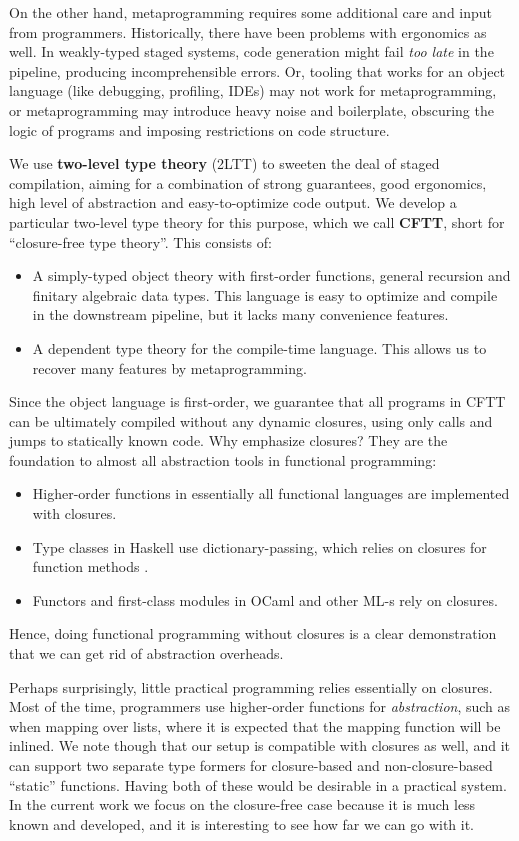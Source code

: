 \documentclass[acmsmall,screen]{acmart}
\theoremstyle{remark}
\begin{document}
On the other hand, metaprogramming requires some additional care and input from
programmers. Historically, there have been problems with ergonomics as well. In
weakly-typed staged systems, code generation might fail \emph{too late} in the
pipeline, producing incomprehensible errors. Or, tooling that works for an
object language (like debugging, profiling, IDEs) may not work for metaprogramming, or
metaprogramming may introduce heavy noise and boilerplate, obscuring the logic
of programs and imposing restrictions on code structure.

We use \textbf{two-level type theory} (2LTT) \cite{twolevel,staged2ltt} to
sweeten the deal of staged compilation, aiming for a combination of strong
guarantees, good ergonomics, high level of abstraction and easy-to-optimize code
output. We develop a particular two-level type theory for this purpose, which we
call \textbf{CFTT}, short for ``closure-free type theory''. This consists of:
\begin{itemize}
\item A simply-typed object theory with first-order functions, general recursion and
      finitary algebraic data types. This language is easy to optimize and compile
      in the downstream pipeline, but it lacks many convenience features.
\item A dependent type theory for the compile-time language. This
      allows us to recover many features by metaprogramming.
\end{itemize}
Since the object language is first-order, we guarantee that all programs in CFTT
can be ultimately compiled without any dynamic closures, using only calls and
jumps to statically known code. Why emphasize closures?  They are the
foundation to almost all abstraction tools in functional programming:
\begin{itemize}
\item Higher-order functions in essentially all functional languages are implemented with closures.
\item Type classes in Haskell use dictionary-passing, which relies on closures for function methods \cite{DBLP:conf/popl/WadlerB89}.
\item Functors and first-class modules in OCaml \cite{leroy2023ocaml} and other ML-s rely on closures.
\end{itemize}
Hence, doing functional programming without closures is a clear demonstration
that we can get rid of abstraction overheads.

Perhaps surprisingly, little practical programming relies essentially on
closures. Most of the time, programmers use higher-order functions for
\emph{abstraction}, such as when mapping over lists, where it is expected that
the mapping function will be inlined. We note though that our setup is
compatible with closures as well, and it can support two separate type formers
for closure-based and non-closure-based ``static'' functions. Having both of
these would be desirable in a practical system. In the current work we focus on
the closure-free case because it is much less known and developed, and it is
interesting to see how far we can go with it.
\end{document}
